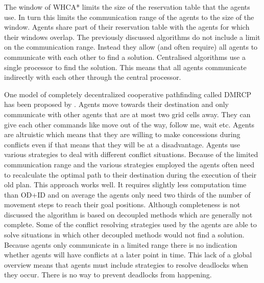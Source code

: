 The window of WHCA* limits the size of the reservation table that the agents 
use. In turn this limits the communication range of the agents to the size of 
the window.
Agents share part of their reservation table with the agents for which their 
windows overlap.
The previously discussed algorithms do not include a limit on the communication 
range. Instead they allow (and often require) all agents to communicate with 
each other to find a solution. Centralised algorithms use a single processor to 
find the solution. This means that all agents communicate indirectly with each 
other through the central processor.

One model of completely decentralized cooperative pathfinding called DMRCP has
been proposed by \cite{wei2016}. Agents move towards their destination and only
communicate with other agents that are at most two grid cells away. They can
give each other commands like
move out of the way, follow me, wait etc. Agents are altruistic which means
that they are willing to make concessions during conflicts even if that means
that they will be at a disadvantage. Agents use various strategies to deal with
different conflict situations. Because of the limited communication range and
the various strategies employed the agents often need to recalculate the
optimal path to their destination during the execution of their old plan. This
approach works well. It requires slightly less computation time than OD+ID and
on average the agents only need two thirds of the number of movement steps to
reach their goal positions. Although completeness is not discussed the
algorithm is based on decoupled methods which are generally not complete. Some
of the conflict resolving strategies used by the agents are able to solve
situations in which other decoupled methods would not find a solution.
Because agents only communicate in a limited range there is no indication
whether agents will have conflicts at a later point in time. This lack of a
global overview means that agents must include strategies to resolve deadlocks
when they occur. There is no way to prevent deadlocks from happening.

